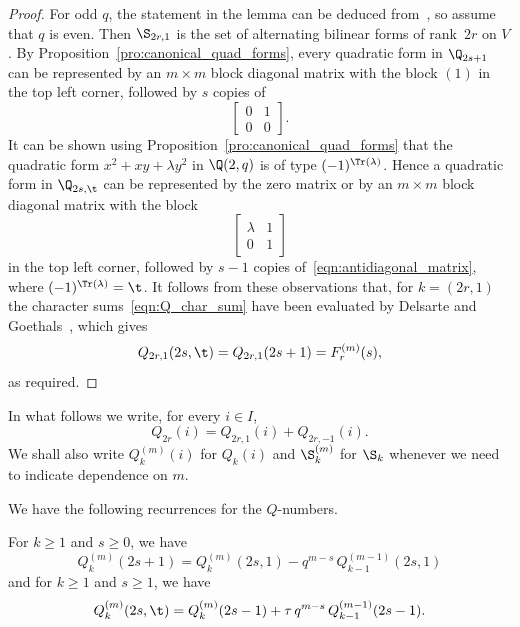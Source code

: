 \begin{proof}
For odd $q$, the statement in the lemma can be deduced from~\cite[Lemma~6.3]{Sch2015}, so assume that $q$ is even. Then $\S_{2r,1}$ is the set of alternating bilinear forms of rank~$2r$ on $V$. By Proposition~\ref{pro:canonical_quad_forms}, every quadratic form in $\Q_{2s+1}$ can be represented by an $m\times m$ block diagonal matrix with the block $(1)$ in the top left corner, followed by $s$ copies of
\begin{equation}
\begin{bmatrix}
0 & 1\\
0 & 0
\end{bmatrix}.   \label{eqn:antidiagonal_matrix}
\end{equation}
It can be shown using Proposition~\ref{pro:canonical_quad_forms} that the quadratic form $x^2+xy+\lambda y^2$ in $\Q(2,q)$ is of type $(-1)^{\Tr(\lambda)}$. Hence a quadratic form in $\Q_{2s,\t}$ can be represented by the zero matrix or by an $m\times m$ block diagonal matrix with the block
\begin{equation}
\begin{bmatrix}
\lambda & 1\\
0       & 1
\end{bmatrix}\label{eqn:top_left_block}
\end{equation}
in the top left corner, followed by $s-1$ copies of~\eqref{eqn:antidiagonal_matrix}, where $(-1)^{\Tr(\lambda)}=\t$. It follows from these observations that, for $k=(2r,1)$ the character sums~\eqref{eqn:Q_char_sum} have been evaluated by Delsarte and Goethals~\cite[Appendix]{DelGoe1975}, which gives 
\[
Q_{2r,1}(2s,\t)=Q_{2r,1}(2s+1)=F^{(m)}_r(s),
\]
as required.
\end{proof}
\par
In what follows we write, for every $i\in I$,
\[
Q_{2r}(i)=Q_{2r,1}(i)+Q_{2r,-1}(i).
\]
We shall also write $Q^{(m)}_k(i)$ for $Q_k(i)$ and $\S_k^{(m)}$ for $\S_k$ whenever we need to indicate dependence on $m$.
\par
We have the following recurrences for the $Q$-numbers.
\begin{lemma}
\label{lem:recurrence_Q}
For $k\ge 1$ and $s\ge 0$, we have
\begin{equation}
Q^{(m)}_k(2s+1)=Q^{(m)}_k(2s,1)-q^{m-s}\,Q^{(m-1)}_{k-1}(2s,1)   \label{eqn:rec_Q_1}
\end{equation}
and for $k\ge 1$ and $s\ge 1$, we have
\begin{equation}
Q^{(m)}_k(2s,\t)=Q^{(m)}_k(2s-1)+\tau\,q^{m-s}\,Q^{(m-1)}_{k-1}(2s-1)   \label{eqn:rec_Q_2}.
\end{equation}
\end{lemma}
